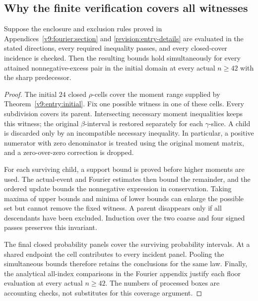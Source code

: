 \subsection{Why the finite verification covers all witnesses}
\begin{proposition}
\label{revision:entry-soundness}
Suppose the enclosure and exclusion rules proved in
Appendices~\ref{v9:fourier:section} and \ref{revision:entry-details}
are evaluated in the stated directions, every required inequality
passes, and every closed-cover incidence is checked. Then the resulting
bounds hold simultaneously for every attained nonnegative-excess pair
in the initial domain at every actual $n\ge42$ with the sharp predecessor.
\end{proposition}
\begin{proof}
The initial $24$ closed $\rho$-cells cover the moment range supplied
by Theorem~\ref{v9:entry:initial}. Fix one possible witness in one of
these cells. Every subdivision covers its parent. Intersecting necessary
moment inequalities keeps this witness; the original $\beta$-interval
is restored separately for each $\gamma$-slice. A child is discarded
only by an incompatible necessary inequality. In particular, a positive
numerator with zero denominator is treated using the original moment
matrix, and a zero-over-zero correction is dropped.

For each surviving child, a support bound is proved before higher
moments are used. The actual-event and Fourier estimates then bound
the remainder, and the ordered update bounds the nonnegative expression
in conservation. Taking maxima of upper bounds and minima of lower
bounds can enlarge the possible set but cannot remove the fixed witness.
A parent disappears only if all descendants have been excluded. Induction
over the two coarse and four signed passes preserves this invariant.

The final closed probability panels cover the surviving probability
intervals. At a shared endpoint the cell contributes to every incident
panel. Pooling the simultaneous bounds therefore retains the conclusions
for the same law. Finally, the analytical all-index comparisons in the
Fourier appendix justify each floor evaluation at every actual $n\ge42$.
The numbers of processed boxes are accounting checks, not substitutes
for this coverage argument.
\end{proof}
